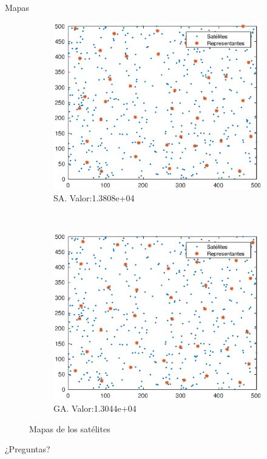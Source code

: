 \documentclass{beamer}
\begin{document}
\begin{frame}{Mapas}
  \begin{figure}
    \begin{subfigure}[b]{0.48\textwidth}
      \includegraphics[width=\textwidth]{../SA/mapSA.eps}
      \caption{SA. Valor:1.3808e+04}
      \label{fig:mapSA}
    \end{subfigure}
    ~
    \begin{subfigure}[b]{0.48\textwidth}
      \includegraphics[width=\textwidth]{../GA/mapGA.eps}
      \caption{GA. Valor:1.3044e+04}
      \label{fig:mapGA}
    \end{subfigure}
    \caption{Mapas de los satélites}
    \label{fig:maps}
  \end{figure}
\end{frame}



\begin{frame}[standout]
  \huge{¿Preguntas?}
\end{frame}
\end{document}
